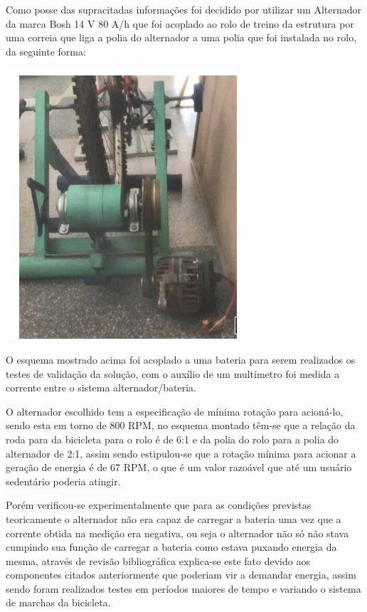 Como posse das supracitadas informações foi decidido por utilizar um Alternador da marca Bosh 14 V 80 A/h que foi acoplado ao rolo de treino da estrutura por uma correia que liga a polia do alternador a uma polia que foi instalada no rolo, da seguinte forma:



 \begin{center}
    	\includegraphics[scale=0.7]{figuras/alt}
        \label{alt}
    \end{center}

O esquema mostrado acima foi acoplado a uma bateria para serem realizados os testes de validação da solução, com o auxílio de um multímetro foi medida a corrente entre o sistema alternador/bateria. 

O alternador escolhido tem a especificação de mínima rotação para acioná-lo, sendo esta em torno de 800 RPM, no esquema montado têm-se que a relação da roda para da bicicleta para o rolo é de 6:1 e da polia do rolo para a polia do alternador de 2:1, assim sendo estipulou-se que a rotação mínima para acionar a geração de energia é de 67 RPM, o que é um valor razoável que até um usuário sedentário poderia atingir. 

Porém verificou-se experimentalmente que para as condições previstas teoricamente o alternador não era capaz de carregar a bateria uma vez que a corrente obtida na medição era negativa, ou seja o alternador não só não stava cumpindo sua função de carregar a bateria como estava puxando energia da mesma, através de revisão bibliográfica explica-se este fato devido aos componentes citados anteriormente que poderiam vir a demandar energia, assim sendo foram realizados testes em períodos maiores de tempo e variando o sistema de marchas da bicicleta. 

